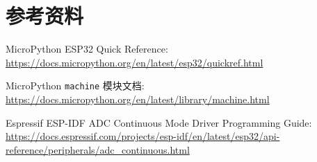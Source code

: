 \documentclass[UTF8,fontset=windows,a4paper,12pt]{ctexart}
\begin{document}
\section{参考资料}

\begin{enumerate}[label={[\arabic*]}]
  \item MicroPython ESP32 Quick Reference: \url{https://docs.micropython.org/en/latest/esp32/quickref.html}
  \item MicroPython \texttt{machine} 模块文档: \url{https://docs.micropython.org/en/latest/library/machine.html}
  \item Espressif ESP-IDF ADC Continuous Mode Driver Programming Guide: \url{https://docs.espressif.com/projects/esp-idf/en/latest/esp32/api-reference/peripherals/adc_continuous.html}
\end{enumerate}
\end{document}
